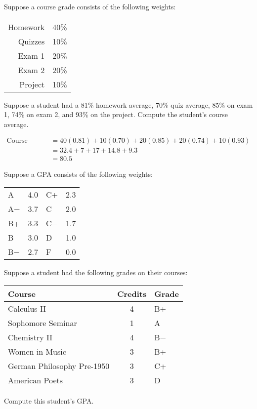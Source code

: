 \documentclass[11pt,letterpaper]{article}
\begin{document}
 Suppose a course grade consists of the following weights:
	\begin{table}[!ht]
	\centering
	\begin{tabular}{rl}
	Homework & 40\% \\
	Quizzes & 10\% \\
	Exam 1 & 20\% \\
	Exam 2 & 20\% \\
	Project & 10\%
	\end{tabular}
	\end{table} \par
Suppose a student had a 81\% homework average, 70\% quiz average, 85\% on exam 1, 74\% on exam 2, and 93\% on the project. Compute the student's course average. \pspace

\sol 
	\[
	\begin{aligned}
	\text{Course Average}&= 40(0.81) + 10(0.70) + 20(0.85) + 20(0.74) + 10(0.93) \\[0.3cm]
	&= 32.4 + 7 + 17 + 14.8 + 9.3 \\[0.3cm]
	&= 80.5
	\end{aligned}
	\]



\newpage



 Suppose a GPA consists of the following weights:
	\begin{table}[!ht]
	\centering
	\begin{tabular}{lr|lr}
	A & 4.0 & C+ & 2.3 \\
	A$-$ & 3.7 & C & 2.0 \\
	B+ & 3.3 & C$-$ & 1.7 \\
	B & 3.0 & D & 1.0 \\
	B$-$ & 2.7 & F & 0.0
	\end{tabular}
	\end{table} \par
Suppose a student had the following grades on their courses:
	\begin{table}[!ht]
	\centering
	\begin{tabular}{lcl}
	Course & Credits & Grade \\ \hline
	Calculus II & 4 & B+ \\
	Sophomore Seminar & 1 & A \\
	Chemistry II & 4 & B$-$ \\
	Women in Music & 3 & B+ \\
	German Philosophy Pre-1950 & 3 & C+ \\
	American Poets & 3 & D
	\end{tabular}
	\end{table}
Compute this student's GPA. \pspace
\end{document}
